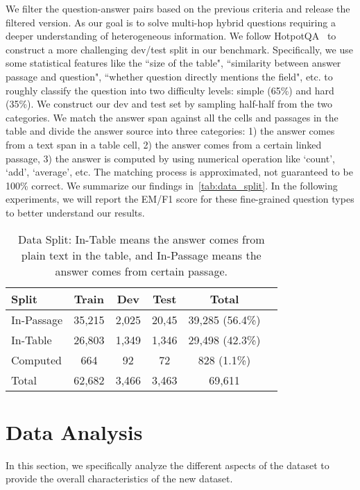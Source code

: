 \documentclass[11pt,a4paper]{article}
\begin{document}
We filter the question-answer pairs based on the previous criteria and release the filtered version. As our goal is to solve multi-hop hybrid questions requiring a deeper understanding of heterogeneous information. We follow HotpotQA~\cite{yang2018hotpotqa} to construct a more challenging dev/test split in our benchmark. Specifically, we use some statistical features like the ``size of the table", ``similarity between answer passage and question", ``whether question directly mentions the field", etc. to roughly classify the question into two difficulty levels: simple (65\%) and hard (35\%). We construct our dev and test set by sampling half-half from the two categories. We match the answer span against all the cells and passages in the table and divide the answer source into three categories: 1) the answer comes from a text span in a table cell, 2) the answer comes from a certain linked passage, 3) the answer is computed by using numerical operation like `count', `add', `average', etc. The matching process is approximated, not guaranteed to be 100\% correct. We summarize our findings in~\autoref{tab:data_split}. In the following experiments, we will report the EM/F1 score for these fine-grained question types to better understand our results.

\begin{table}[!ht]
\small
\centering
\begin{tabular}{lccccc}
\toprule
Split & Train & Dev & Test & Total \\
\midrule
In-Passage  &  35,215 & 2,025  & 20,45  & 39,285 (56.4\%) \\
In-Table & 26,803 & 1,349 & 1,346 & 29,498 (42.3\%)  \\
Computed & 664  & 92 & 72 & 828 (1.1\%) \\
Total & 62,682 & 3,466 & 3,463 & 69,611 \\
\bottomrule
\end{tabular}
\caption{Data Split: In-Table means the answer comes from plain text in the table, and In-Passage means the answer comes from certain passage. }
\label{tab:data_split}
\vspace{-2ex}
\end{table}


\section{Data Analysis}
In this section, we specifically analyze the different aspects of the dataset to provide the overall characteristics of the new dataset.
\end{document}
